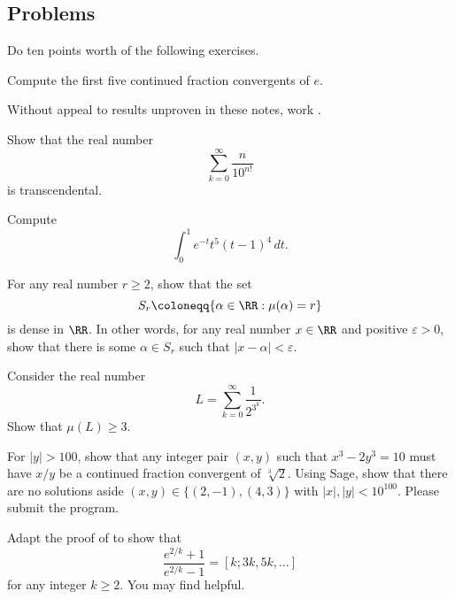 \documentclass[../notes.tex]{subfiles}
\begin{document}
\subsection{Problems}
Do ten points worth of the following exercises.
\begin{prob}[1 points]
	Compute the first five continued fraction convergents of $e$.
\end{prob}
\begin{prob}[2 points]
	Without appeal to results unproven in these notes, work .
\end{prob}
\begin{prob}[3 points]
	Show that the real number
	\[\sum_{k=0}^\infty\frac n{10^{n!}}\]
	is transcendental.
\end{prob}
\begin{prob}[3 points]
	Compute
	\[\int_0^1e^{-t}t^5(t-1)^4\,dt.\]
\end{prob}
\begin{prob}[3 points]
	For any real number $r\ge2$, show that the set
	\[S_r\coloneqq\{\alpha\in\RR:\mu(\alpha)=r\}\]
	is dense in $\RR$. In other words, for any real number $x\in\RR$ and positive $\varepsilon>0$, show that there is some $\alpha\in S_r$ such that $\left|x-\alpha\right|<\varepsilon$.
\end{prob}
\begin{prob}[4 points]
	Consider the real number
	\[L=\sum_{k=0}^\infty\frac1{2^{3^k}}.\]
	Show that $\mu(L)\ge3$.
\end{prob}
\begin{prob}[5 points]
	For $\left|y\right|>100$, show that any integer pair $(x,y)$ such that $x^3-2y^3=10$ must have $x/y$ be a continued fraction convergent of $\sqrt[3]2$. Using Sage, show that there are no solutions aside $(x,y)\in\{(2,-1),(4,3)\}$ with $\left|x\right|,\left|y\right|<10^{100}$. Please submit the program.
\end{prob}
\begin{prob}[10 points]
	Adapt the proof of  to show that
	\[\frac{e^{2/k}+1}{e^{2/k}-1}=[k;3k,5k,\ldots]\]
	for any integer $k\ge2$. You may find \cite{olds-cf-e} helpful.
\end{prob}
\end{document}
